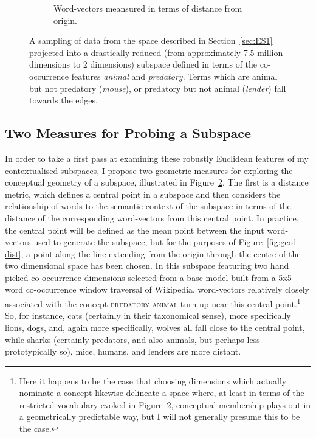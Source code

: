 \begin{figure}
\begin{subfigure}[]{0.45\textwidth}
  \caption{Word-vectors meansured in terms of distance from origin.}\label{fig:geo1-norm}
  \end{subfigure}
  \caption{A sampling of data from the space described in Section~\ref{sec:ES1} projected into a drastically reduced (from approximately 7.5 million dimensions to 2 dimensions) subspace defined in terms of the co-occurrence features \emph{animal} and \emph{predatory}. Terms which are animal but not predatory (\emph{mouse}), or predatory but not animal (\emph{lender}) fall towards the edges.}\label{fig:geo1}
\end{figure}

\subsection{Two Measures for Probing a Subspace}

In order to take a first pass at examining these robustly Euclidean features of my contextualised subspaces, I propose two geometric measures for exploring the conceptual geometry of a subspace, illustrated in Figure~\ref{fig:geo1}.  The first is a distance metric, which defines a central point in a subspace and then considers the relationship of words to the semantic context of the subspace in terms of the distance of the corresponding word-vectors from this central point.  In practice, the central point will be defined as the mean point between the input word-vectors used to generate the subspace, but for the purposes of Figure~\ref{fig:geo1-dist}, a point along the line extending from the origin through the centre of the two dimensional space has been chosen.  In this subspace featuring two hand picked co-occurrence dimensions selected from a base model built from a 5x5 word co-occurrence window traversal of Wikipedia, word-vectors relatively closely associated with the concept \textsc{predatory animal} turn up near this central point.\footnote{Here it happens to be the case that choosing dimensions which actually nominate a concept likewise delineate a space where, at least in terms of the restricted vocabulary evoked in Figure~\ref{fig:geo1}, conceptual membership plays out in a geometrically predictable way, but I will not generally presume this to be the case.}  So, for instance, cats (certainly in their taxonomical sense), more specifically lions, dogs, and, again more specifically, wolves all fall close to the central point, while sharks (certainly predators, and also animals, but perhaps less prototypically so), mice, humans, and lenders are more distant.

